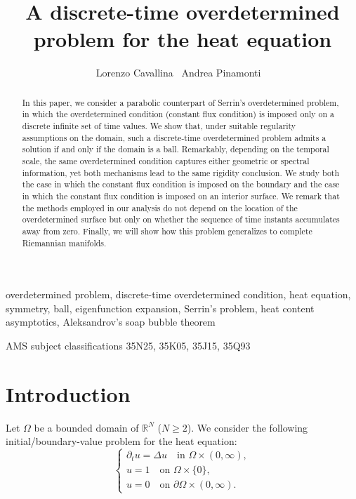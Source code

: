 \documentclass[a4paper,11pt]{article}
\title{A discrete-time overdetermined problem for the heat equation
}
\author{Lorenzo Cavallina \, Andrea Pinamonti \
}
\date{}
\makeatletter
\newenvironment{@abssec}[1]{%
    \if@twocolumn

      \section*{#1}%
    \else

      \vspace{.05in}\footnotesize
      \parindent .2in
 {\upshape\bfseries #1. }\ignorespaces
    \fi}
\newenvironment{keywords}{\begin{@abssec}{\keywordsname}}{\end{@abssec}}
\newenvironment{AMS}{\begin{@abssec}{\AMSname}}{\end{@abssec}}
\newcommand\keywordsname{Key words}
\newcommand\AMSname{AMS subject classifications}
\numberwithin{equation}{section}
\makeatother
\begin{document}
\maketitle


\begin{abstract}
In this paper, we consider a parabolic counterpart of Serrin's overdetermined problem, in which the overdetermined condition (constant flux condition) is imposed only on a discrete infinite set of time values. We show that, under suitable regularity assumptions on the domain, such a discrete-time overdetermined problem admits a solution if and only if the domain is a ball. Remarkably, depending on the temporal scale, the same overdetermined condition captures either geometric or spectral information, yet both mechanisms lead to the same rigidity conclusion. We study both the case in which the constant flux condition is imposed on the boundary and the case in which the constant flux condition is imposed on an interior surface. We remark that the methods employed in our analysis do not depend on the location of the overdetermined surface but only on whether the sequence of time instants accumulates away from zero. Finally, we will show how this problem generalizes to complete Riemannian manifolds.
\end{abstract}

\begin{keywords}
overdetermined problem, discrete-time overdetermined condition, heat equation, symmetry, ball, eigenfunction expansion, Serrin's problem, heat content asymptotics, Aleksandrov's soap bubble theorem
\end{keywords}
\begin{AMS}
35N25, 35K05, 35J15, 35Q93
\end{AMS}


\maketitle



\pagestyle{plain}
\thispagestyle{plain}

\section{Introduction}\label{section introduction}


Let $\Omega$ be a bounded domain of $\mathbb{R}^N$ ($N\ge 2$).
We consider the following initial/boundary-value problem for the heat equation:
\begin{equation}\label{heat}
  \begin{cases}
      \partial_t u = \Delta u \quad \text{in }\Omega\times (0,\infty),\\
      u=1\quad \text{on } \Omega\times\{0\},\\
      u=0\quad \text{on }\partial\Omega\times(0,\infty).
  \end{cases}  
\end{equation}
\end{document}
